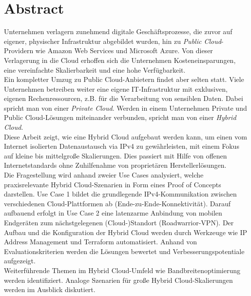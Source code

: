 \chapter{Abstract}

Unternehmen verlagern zunehmend digitale Geschäftsprozesse, die zuvor auf eigener, physischer Infrastruktur abgebildet wurden, hin zu \textit{Public Cloud}-Providern wie Amazon Web Services und Microsoft Azure. Von dieser Verlagerung in die Cloud erhoffen sich die Unternehmen Kosteneinsparungen, eine vereinfachte Skalierbarkeit und eine hohe Verfügbarkeit.\\
Ein kompletter Umzug zu Public Cloud-Anbietern findet aber selten statt. Viele Unternehmen betreiben weiter eine eigene IT-Infrastruktur mit exklusiven, eigenen Rechenressourcen, z.B. für die Verarbeitung von sensiblen Daten. Dabei spricht man von einer \textit{Private Cloud}. Werden in einem Unternehmen Private und Public Cloud-Lösungen miteinander verbunden, spricht man von einer \textit{Hybrid Cloud}. \\
Diese Arbeit zeigt, wie eine Hybrid Cloud aufgebaut werden kann, um einen vom Internet isolierten Datenaustausch via IPv4 zu gewährleisten, mit einem Fokus auf kleine bis mittelgroße Skalierungen. Dies passiert mit Hilfe von offenen Internetstandards ohne Zuhilfenahme von proprietären Herstellerlösungen.\\
Die Fragestellung wird anhand zweier Use Cases analysiert, welche praxisrelevante Hybrid Cloud-Szenarien in Form eines Proof of Concepts darstellen. Use Case 1 bildet die grundlegende IPv4-Kommunikation zwischen verschiedenen Cloud-Plattformen ab (\glqq Ende-zu-Ende-Konnektivität\grqq{}). Darauf aufbauend erfolgt in Use Case 2 eine latenzarme Anbindung von mobilen Endgeräten zum nächstgelegenen (Cloud-)Standort (\glqq Roadwarrior-VPN\grqq{}). Der Aufbau und die Konfiguration der Hybrid Cloud werden durch Werkzeuge wie IP Address Management und Terraform automatisiert. Anhand von Evaluationskriterien werden die Lösungen bewertet und Verbesserungspotentiale aufgezeigt.\\
Weiterführende Themen im Hybrid Cloud-Umfeld wie Bandbreitenoptimierung werden identifiziert. Analoge Szenarien für große Hybrid Cloud-Skalierungen werden im Ausblick diskutiert.